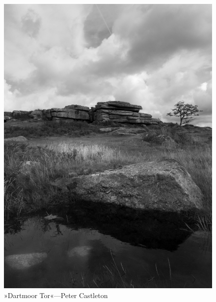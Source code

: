 \documentclass[
paper=5.5in:8.5in,
BCOR=7mm,
twoside,
DIV=calc,
11pt,
usegeometry,
chapterprefix,
endperiod,
headings=big]{scrbook} %
\def\picsize{\textwidth}
\def\picsize{\textwidth}
\begin{document}
\cleardoubleevenpage
\vfill
\begin{figure}[ph!]
	\centering
	\includegraphics[width=\picsize]{dartmoortorcropped}
	\caption{»Dartmoor Tor«—Peter Castleton}
	\label{tor}
\end{figure}
\vfill
\thispagestyle{empty}
\clearpage


\pagestyle{headings}
\renewcommand*{\chapterpagestyle}{plain}
















\end{document}
